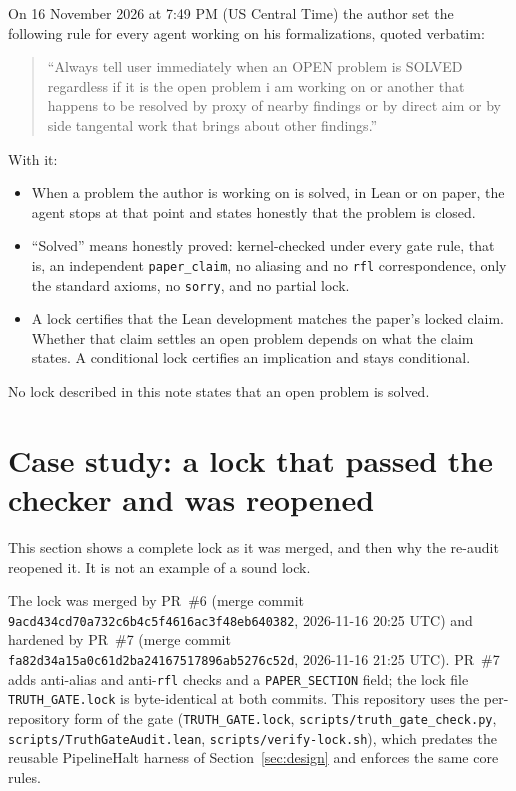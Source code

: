 \documentclass[11pt,a4paper]{article}
\newcommand{\code}[1]{\texttt{#1}}
\begin{document}
On 16 November 2026 at 7:49 PM (US Central Time) the author set the following rule for every
agent working on his formalizations, quoted verbatim:
\begin{quote}\small
``Always tell user immediately when an OPEN problem is SOLVED regardless if it is the open
problem i am working on or another that happens to be resolved by proxy of nearby findings or by
direct aim or by side tangental work that brings about other findings.''
\end{quote}
With it:
\begin{itemize}
\item When a problem the author is working on is solved, in Lean or on paper, the agent stops at
  that point and states honestly that the problem is closed.
\item ``Solved'' means honestly proved: kernel-checked under every gate rule, that is, an
  independent \code{paper\_claim}, no aliasing and no \code{rfl} correspondence, only the standard
  axioms, no \code{sorry}, and no partial lock.
\item A lock certifies that the Lean development matches the paper's locked claim. Whether that
  claim settles an open problem depends on what the claim states. A conditional lock certifies
  an implication and stays conditional.
\end{itemize}
No lock described in this note states that an open problem is solved.

\section{Case study: a lock that passed the checker and was reopened}
\label{sec:example}

This section shows a complete lock as it was merged, and then why the re-audit reopened it. It is
not an example of a sound lock.


The lock was merged by PR~\#6 (merge commit
\code{9acd434cd70a732c6b4c5f4616ac3f48eb640382}, 2026-11-16 20:25 UTC) and hardened by PR~\#7
(merge commit \code{fa82d34a15a0c61d2ba24167517896ab5276c52d}, 2026-11-16 21:25 UTC). PR~\#7
adds anti-alias and anti-\code{rfl} checks and a \code{PAPER\_SECTION} field; the lock file
\code{TRUTH\_GATE.lock} is byte-identical at both commits. This repository uses the per-repository
form of the gate (\code{TRUTH\_GATE.lock}, \code{scripts/truth\_gate\_check.py},
\code{scripts/TruthGateAudit.lean}, \code{scripts/verify-lock.sh}), which predates the reusable
PipelineHalt harness of Section~\ref{sec:design} and enforces the same core rules.
\end{document}
